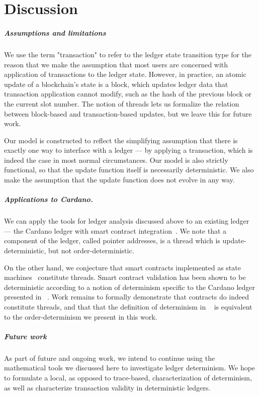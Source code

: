 \section{Discussion}

\subparagraph*{Assumptions and limitations}
We use the term "transaction" to refer to the ledger state transition type
for the reason that we make the assumption that most users are concerned with
application of transactions to the ledger state.
However, in practice, an atomic update of a blockchain's state is a block,
which updates ledger data that transaction application cannot modify,
such as the hash of the previous block or the current slot number.
The notion of threads lets us formalize the relation between
block-based and transaction-based updates, but we leave this for future work.

Our model is constructed to reflect the simplifying
assumption that there is exactly one way to interface with a ledger --- by applying
a transaction, which is indeed the case in most normal circumstances.
Our model is also strictly functional, so that the update function itself
is necessarily deterministic. We also make the assumption that the update function
does not evolve in any way.

\vspace{-.2cm}
\subparagraph*{Applications to Cardano.}
We can apply the tools for ledger analysis discussed above to an existing ledger ---
the Cardano ledger with smart contract integration~\cite{alonzo}.
We note that a component of the ledger, called pointer addresses,
is a thread which is update-deterministic, but not order-deterministic.

On the other hand, we conjecture that smart contracts implemented as state machines~\cite{eutxo} constitute threads.
Smart contract validation has been shown to be deterministic according to a
notion of determinism specific to the Cardano ledger presented in ~\cite{alonzo}.
Work remains to formally demonstrate that contracts do indeed constitute threads,
and that that the definition of determinism in ~\cite{alonzo} is equivalent
to the order-determinism we present in this work.

\vspace{-.2cm}
\subparagraph*{Future work}
As part of future and ongoing work, we intend to continue using the mathematical
tools we discussed here to investigate
ledger determinism. We
hope to formulate a local, as opposed to trace-based, characterization of determinism,
as well as characterize transaction validity in deterministic ledgers.

